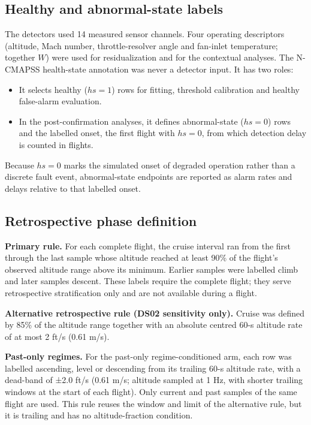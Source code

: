 \documentclass[preprint,11pt,a4paper]{elsarticle}
\begin{document}
\subsection{Healthy and abnormal-state labels}

The detectors used 14 measured sensor channels. Four operating descriptors (altitude, Mach number, throttle-resolver angle and fan-inlet temperature; together $W$) were used for residualization and for the contextual analyses. The N-CMAPSS health-state annotation was never a detector input. It has two roles:
\begin{itemize}
\item It selects healthy ($hs = 1$) rows for fitting, threshold calibration and healthy false-alarm evaluation.
\item In the post-confirmation analyses, it defines abnormal-state ($hs = 0$) rows and the labelled onset, the first flight with $hs = 0$, from which detection delay is counted in flights.
\end{itemize}

Because $hs = 0$ marks the simulated onset of degraded operation rather than a discrete fault event, abnormal-state endpoints are reported as alarm rates and delays relative to that labelled onset.

\subsection{Retrospective phase definition}

\textbf{Primary rule.} For each complete flight, the cruise interval ran from the first through the last sample whose altitude reached at least 90\% of the flight's observed altitude range above its minimum. Earlier samples were labelled climb and later samples descent. These labels require the complete flight; they serve retrospective stratification only and are not available during a flight.

\textbf{Alternative retrospective rule (DS02 sensitivity only).} Cruise was defined by 85\% of the altitude range together with an absolute centred 60-s altitude rate of at most 2 ft/s (0.61 m/s).

\textbf{Past-only regimes.} For the past-only regime-conditioned arm, each row was labelled ascending, level or descending from its trailing 60-s altitude rate, with a dead-band of ±2.0 ft/s (0.61 m/s; altitude sampled at 1 Hz, with shorter trailing windows at the start of each flight). Only current and past samples of the same flight are used. This rule reuses the window and limit of the alternative rule, but it is trailing and has no altitude-fraction condition.
\end{document}
